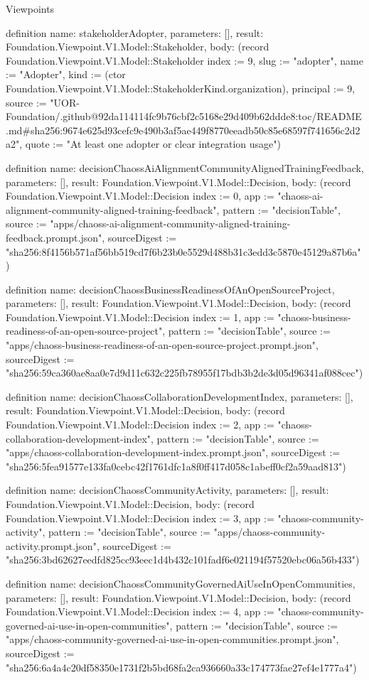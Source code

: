 \begin{lexlean}{Viewpoints}
\begin{semanticmodule}
definition{
  name: stakeholderAdopter,
  parameters: [],
  result: Foundation.Viewpoint.V1.Model::Stakeholder,
  body: (record Foundation.Viewpoint.V1.Model::Stakeholder {index := 9, slug := "adopter", name := "Adopter", kind := (ctor Foundation.Viewpoint.V1.Model::StakeholderKind.organization), principal := 9, source := "UOR-Foundation/.github@92da114114fc9b76cbf2c5168e29d409b62ddde8:toc/README.md#sha256:9674e625d93cefc9e490b3af5ae449f8770eeadb50c85e68597f741656c2d2a2", quote := "At least one adopter or clear integration usage"})
}

definition{
  name: decisionChaossAiAlignmentCommunityAlignedTrainingFeedback,
  parameters: [],
  result: Foundation.Viewpoint.V1.Model::Decision,
  body: (record Foundation.Viewpoint.V1.Model::Decision {index := 0, app := "chaoss-ai-alignment-community-aligned-training-feedback", pattern := "decisionTable", source := "apps/chaoss-ai-alignment-community-aligned-training-feedback.prompt.json", sourceDigest := "sha256:8f4156b571af56bb519cd7f6b23b0e5529d488b31c3edd3c5870e45129a87b6a"})
}

definition{
  name: decisionChaossBusinessReadinessOfAnOpenSourceProject,
  parameters: [],
  result: Foundation.Viewpoint.V1.Model::Decision,
  body: (record Foundation.Viewpoint.V1.Model::Decision {index := 1, app := "chaoss-business-readiness-of-an-open-source-project", pattern := "decisionTable", source := "apps/chaoss-business-readiness-of-an-open-source-project.prompt.json", sourceDigest := "sha256:59ca360ae8aa0e7d9d11c632c225fb78955f17bdb3b2de3d05d96341af088cec"})
}

definition{
  name: decisionChaossCollaborationDevelopmentIndex,
  parameters: [],
  result: Foundation.Viewpoint.V1.Model::Decision,
  body: (record Foundation.Viewpoint.V1.Model::Decision {index := 2, app := "chaoss-collaboration-development-index", pattern := "decisionTable", source := "apps/chaoss-collaboration-development-index.prompt.json", sourceDigest := "sha256:5fea91577e133fa0cebc42f1761dfc1a8f0ff417d058c1abeff0cf2a59aad813"})
}

definition{
  name: decisionChaossCommunityActivity,
  parameters: [],
  result: Foundation.Viewpoint.V1.Model::Decision,
  body: (record Foundation.Viewpoint.V1.Model::Decision {index := 3, app := "chaoss-community-activity", pattern := "decisionTable", source := "apps/chaoss-community-activity.prompt.json", sourceDigest := "sha256:3bd62627eedfd825cc93eec1d4b432c101fadf6e021194f57520ebc06a56b433"})
}

definition{
  name: decisionChaossCommunityGovernedAiUseInOpenCommunities,
  parameters: [],
  result: Foundation.Viewpoint.V1.Model::Decision,
  body: (record Foundation.Viewpoint.V1.Model::Decision {index := 4, app := "chaoss-community-governed-ai-use-in-open-communities", pattern := "decisionTable", source := "apps/chaoss-community-governed-ai-use-in-open-communities.prompt.json", sourceDigest := "sha256:6a4a4c20df58350e1731f2b5bd68fa2ca936660a33c174773fae27ef4e1777a4"})
}


\end{semanticmodule}
\end{lexlean}
